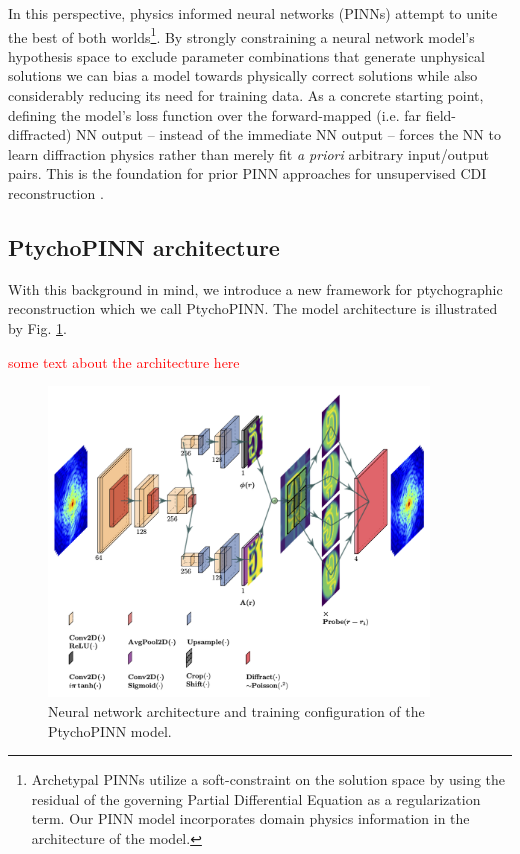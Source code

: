 \documentclass[sn-mathphys]{sn-jnl}%
\theoremstyle{thmstyleone}%
\theoremstyle{thmstyletwo}%
\theoremstyle{thmstylethree}%
\begin{document}
In this perspective, physics informed neural networks (PINNs) attempt to unite the best of both worlds\footnote{Archetypal PINNs utilize a soft-constraint on the solution space by using the residual of the governing Partial Differential Equation as a regularization term. Our PINN model incorporates domain physics information in the architecture of the model.}. By strongly constraining a neural network model's hypothesis space to exclude parameter combinations that generate unphysical solutions we can bias a model towards physically correct solutions while also considerably reducing its need for training data. As a concrete starting point, defining the model's loss function over the forward-mapped (i.e. far field-diffracted) NN output -- instead of the immediate NN output -- forces the NN to learn diffraction physics rather than merely fit \emph{a priori} arbitrary input/output pairs. This is the foundation for prior PINN approaches for unsupervised CDI reconstruction \cite{yao2022autophasenn, ratner2021recovering}.

\subsection{PtychoPINN architecture}
With this background in mind, we introduce a new framework for ptychographic reconstruction which we call PtychoPINN. The model architecture is illustrated by Fig. \ref{diagram}.

\textcolor{red}{some text about the architecture here}

\begin{figure}[h]%
\centering
\includegraphics[width=0.9\textwidth]{figures/lett.png}
\caption{Neural network architecture and training configuration of the PtychoPINN model.}\label{diagram}
\end{figure}
\end{document}
